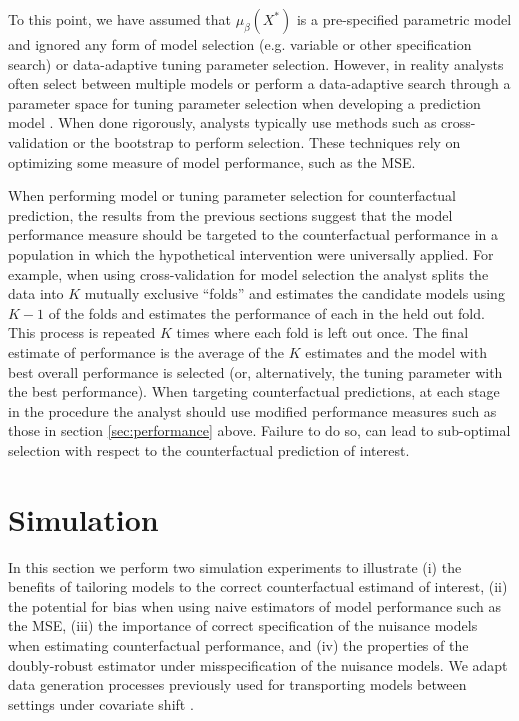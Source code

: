 To this point, we have assumed that $\mu_{\beta}(X^*)$ is a pre-specified parametric model and ignored any form of model selection (e.g. variable or other specification search) or data-adaptive tuning parameter selection. However, in reality analysts often select between multiple models or perform a data-adaptive search through a parameter space for tuning parameter selection when developing a prediction model \cite{steyerberg_clinical_2019}. When done rigorously, analysts typically use methods such as cross-validation or the bootstrap to perform selection. These techniques rely on optimizing some measure of model performance, such as the MSE.

When performing model or tuning parameter selection for counterfactual prediction, the results from the previous sections suggest that the model performance measure should be targeted to the counterfactual performance in a population in which the hypothetical intervention were universally applied. For example, when using cross-validation for model selection the analyst splits the data into $K$ mutually exclusive ``folds'' and estimates the candidate models using $K - 1$ of the folds and estimates the performance of each in the held out fold. This process is repeated $K$ times where each fold is left out once. The final estimate of performance is the average of the $K$ estimates and the model with best overall performance is selected (or, alternatively, the tuning parameter with the best performance). When targeting counterfactual predictions, at each stage in the procedure the analyst should use modified performance measures such as those in section \ref{sec:performance} above. Failure to do so, can lead to sub-optimal selection with respect to the counterfactual prediction of interest. 


\section{Simulation} \label{sec:simulation}
In this section we perform two simulation experiments to illustrate (i) the benefits of tailoring models to the correct counterfactual estimand of interest, (ii) the potential for bias when using naive estimators of model performance such as the MSE, (iii) the importance of correct specification of the nuisance models when estimating counterfactual performance, and (iv) the properties of the doubly-robust estimator under misspecification of the nuisance models. We adapt data generation processes previously used for transporting models between settings under covariate shift \cite{steingrimsson_transporting_2021,morrison_robust_2022}.

